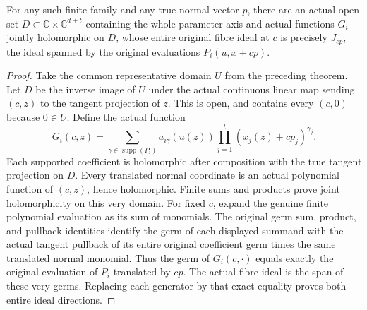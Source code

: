 \begin{theorem}
\label{hir:actual-translated-normal-joint-family}
\leanok
For any such finite family and any true normal vector $p$, there are an
actual open set $D\subset\mathbb C\times\mathbb C^{d+t}$ containing the
whole parameter axis and actual functions $G_i$ jointly holomorphic on
$D$, whose entire original fibre ideal at $c$ is precisely $J_{cp}$,
the ideal spanned by the original evaluations $P_i(u,x+cp)$.
\end{theorem}
\begin{proof}
Take the common representative domain $U$ from the preceding theorem.
Let $D$ be the inverse image of $U$ under the actual continuous linear
map sending $(c,z)$ to the tangent projection of $z$. This is open,
and contains every $(c,0)$ because $0\in U$. Define the actual function
\[
 G_i(c,z)=\sum_{\gamma\in\operatorname{supp}(P_i)}
 a_{i\gamma}(u(z))\prod_{j=1}^{t}(x_j(z)+cp_j)^{\gamma_j}.
\]
Each supported coefficient is holomorphic after composition with the
true tangent projection on $D$. Every translated normal coordinate is
an actual polynomial function of $(c,z)$, hence holomorphic. Finite
sums and products prove joint holomorphicity on this very domain.
For fixed $c$, expand the genuine finite polynomial evaluation as its
sum of monomials. The original germ sum, product, and pullback identities
identify the germ of each displayed summand with the actual tangent
pullback of its entire original coefficient germ times the same
translated normal monomial. Thus the germ of $G_i(c,\cdot)$ equals
exactly the original evaluation of $P_i$ translated by $cp$.
The actual fibre ideal is the span of these very germs. Replacing each
generator by that exact equality proves both entire ideal directions.
\end{proof}

